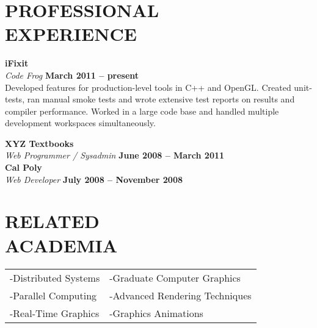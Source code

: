 \documentclass[margin,line]{resume}
\begin{document}
\begin{resume}
\sectionline

    \section{\mysidestyle \textbf{\large{P}\small{ROFESSIONAL\\EXPERIENCE}}}

    \textbf{\listing iFixit} \vspace{2mm}\\\vspace{1mm}%
    \textsl{Code Frog} \hfill \textbf{March 2011 -- present}\\
    Developed features for production-level tools in C++ and OpenGL.
    Created unit-tests, ran manual smoke tests and wrote extensive test reports on results and compiler performance.
    Worked in a large code base and handled multiple development workspaces simultaneously.

    \textbf{\listing XYZ Textbooks} \vspace{2mm}\\\vspace{1mm}%
    \textsl{Web Programmer / Sysadmin} \hfill \textbf{June 2008 -- March 2011}\\
    
    \textbf{\listing Cal Poly} \vspace{2mm}\\\vspace{1mm}%
    \textsl{Web Developer} \hfill \textbf{July 2008 -- November 2008}\\

\sectionline

    \section{\mysidestyle \textbf{\large{R}\small{ELATED\\ACADEMIA}}} 

  \vspace{1mm} %
  \begin{tabular}{@{}p{6cm}p{6cm}}
  -Distributed Systems     &  -Graduate Computer Graphics   \\
  -Parallel Computing      &  -Advanced Rendering Techniques\\
  -Real-Time Graphics      &  -Graphics Animations          \\
  \end{tabular}


\end{resume}
\end{document}
